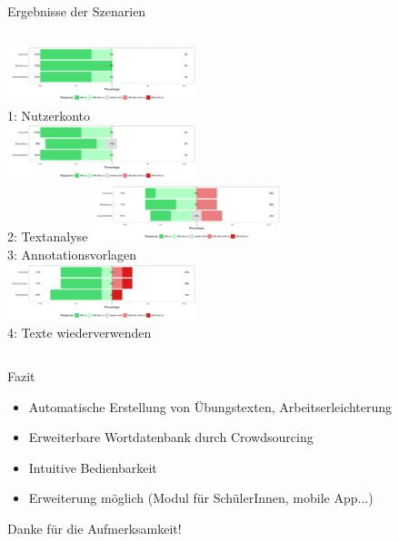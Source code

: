 \documentclass{beamer}
\begin{document}
\begin{frame}{Ergebnisse der Szenarien}
\begin{columns}[t]
	\centering
	\includegraphics[width=5.5cm]{../figures/evaluation/scenario1}\\
	1: Nutzerkonto\\
	[1.5cm]
	\includegraphics[width=5.5cm]{../figures/evaluation/scenario2}\\
	2: Textanalyse
	\centering
	\includegraphics[width=5.5cm]{../figures/evaluation/scenario3}\\
	3: Annotationsvorlagen\\
	[1.5cm]
	\includegraphics[width=5.5cm]{../figures/evaluation/scenario4}\\
	4: Texte wiederverwenden
\end{columns}
\end{frame}

\begin{frame}{Fazit}
\begin{itemize}
	\item Automatische Erstellung von Übungstexten, Arbeitserleichterung
	\item Erweiterbare Wortdatenbank durch Crowdsourcing
	\item Intuitive Bedienbarkeit
	\item Erweiterung möglich (Modul für SchülerInnen, mobile App...)
\end{itemize}
\end{frame}

\begin{frame}[plain]
\centering
\huge{Danke für die Aufmerksamkeit!}
\\
[1cm]
\huge{\color{beaver}{$\rightarrow$ Fragen und Demo}}
\end{frame}
\end{document}
